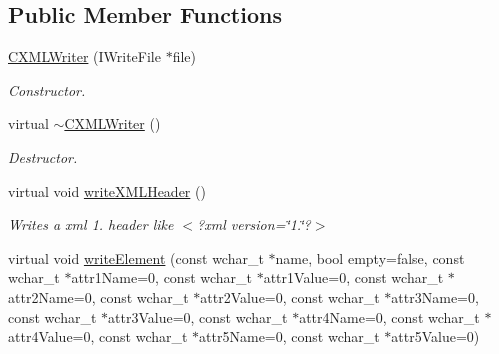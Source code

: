\subsection*{Public Member Functions}
\begin{DoxyCompactItemize}
\item 
\hypertarget{classirr_1_1io_1_1_c_x_m_l_writer_a145f6db13dd7c0b97cfe109167edf326}{\hyperlink{classirr_1_1io_1_1_c_x_m_l_writer_a145f6db13dd7c0b97cfe109167edf326}{C\-X\-M\-L\-Writer} (I\-Write\-File $\ast$file)}\label{classirr_1_1io_1_1_c_x_m_l_writer_a145f6db13dd7c0b97cfe109167edf326}

\begin{DoxyCompactList}\small\item\em Constructor. \end{DoxyCompactList}\item 
\hypertarget{classirr_1_1io_1_1_c_x_m_l_writer_a85bcb4a9c28d7cece400455a92b6b288}{virtual \hyperlink{classirr_1_1io_1_1_c_x_m_l_writer_a85bcb4a9c28d7cece400455a92b6b288}{$\sim$\-C\-X\-M\-L\-Writer} ()}\label{classirr_1_1io_1_1_c_x_m_l_writer_a85bcb4a9c28d7cece400455a92b6b288}

\begin{DoxyCompactList}\small\item\em Destructor. \end{DoxyCompactList}\item 
\hypertarget{classirr_1_1io_1_1_c_x_m_l_writer_ae7bad40d7e4538b9f4d2fa235e3b6e92}{virtual void \hyperlink{classirr_1_1io_1_1_c_x_m_l_writer_ae7bad40d7e4538b9f4d2fa235e3b6e92}{write\-X\-M\-L\-Header} ()}\label{classirr_1_1io_1_1_c_x_m_l_writer_ae7bad40d7e4538b9f4d2fa235e3b6e92}

\begin{DoxyCompactList}\small\item\em Writes a xml 1. header like $<$?xml version=\char`\"{}1.\char`\"{}?$>$ \end{DoxyCompactList}\item 
\hypertarget{classirr_1_1io_1_1_c_x_m_l_writer_a8438e590a2c52853fa4f8aa7064c4ce6}{virtual void \hyperlink{classirr_1_1io_1_1_c_x_m_l_writer_a8438e590a2c52853fa4f8aa7064c4ce6}{write\-Element} (const wchar\-\_\-t $\ast$name, bool empty=false, const wchar\-\_\-t $\ast$attr1\-Name=0, const wchar\-\_\-t $\ast$attr1\-Value=0, const wchar\-\_\-t $\ast$attr2\-Name=0, const wchar\-\_\-t $\ast$attr2\-Value=0, const wchar\-\_\-t $\ast$attr3\-Name=0, const wchar\-\_\-t $\ast$attr3\-Value=0, const wchar\-\_\-t $\ast$attr4\-Name=0, const wchar\-\_\-t $\ast$attr4\-Value=0, const wchar\-\_\-t $\ast$attr5\-Name=0, const wchar\-\_\-t $\ast$attr5\-Value=0)}\label{classirr_1_1io_1_1_c_x_m_l_writer_a8438e590a2c52853fa4f8aa7064c4ce6}


\end{DoxyCompactItemize}
